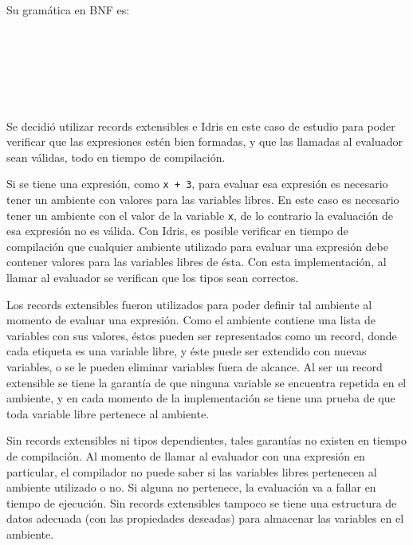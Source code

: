 Su gramática en BNF es:

\begin{bnf*}
   { \bnfor {} \bnfor {} \bnfor {}}\\
   {}\\
   {}\\
   { \bnfsp \bnfts{+} \bnfsp {}}\\
   { \bnfsp {} \bnfsp \bnfts{:=} \bnfsp {} \bnfsp {} \bnfsp \bnfts{(} \bnfsp {} \bnfsp \bnfts{)}}\\
\end{bnf*}

Se decidió utilizar records extensibles e Idris en este caso de estudio para poder verificar que las expresiones estén bien formadas, y que las llamadas al evaluador sean válidas, todo en tiempo de compilación.

Si se tiene una expresión, como \texttt{x + 3}, para evaluar esa expresión es necesario tener un ambiente con valores para las variables libres. En este caso es necesario tener un ambiente con el valor de la variable \texttt{x}, de lo contrario la evaluación de esa expresión no es válida. Con Idris, es posible verificar en tiempo de compilación que cualquier ambiente utilizado para evaluar una expresión debe contener valores para las variables libres de ésta. Con esta implementación, al llamar al evaluador se verifican que los tipos sean correctos.

Los records extensibles fueron utilizados para poder definir tal ambiente al momento de evaluar una expresión. Como el ambiente contiene una lista de variables con sus valores, éstos pueden ser representados como un record, donde cada etiqueta es una variable libre, y éste puede ser extendido con nuevas variables, o se le pueden eliminar variables fuera de alcance. Al ser un record extensible se tiene la garantía de que ninguna variable se encuentra repetida en el ambiente, y en cada momento de la implementación se tiene una prueba de que toda variable libre pertenece al ambiente.

Sin records extensibles ni tipos dependientes, tales garantías no existen en tiempo de compilación. Al momento de llamar al evaluador con una expresión en particular, el compilador no puede saber si las variables libres pertenecen al ambiente utilizado o no. Si alguna no pertenece, la evaluación va a fallar en tiempo de ejecución. Sin records extensibles tampoco se tiene una estructura de datos adecuada (con las propiedades deseadas) para almacenar las variables en el ambiente.

